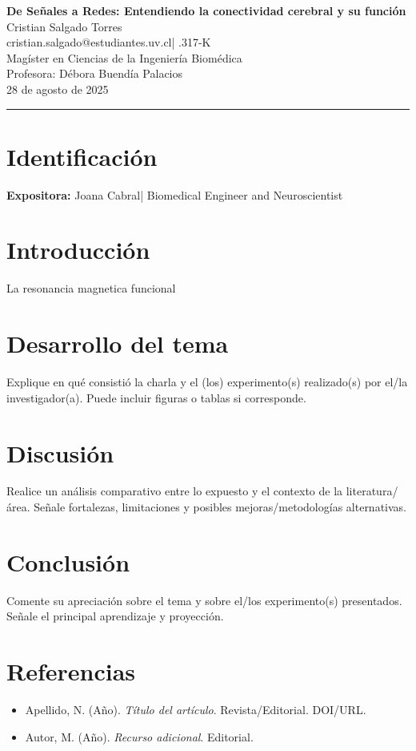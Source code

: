 \documentclass[10pt]{article}
\makeatletter
\newcommand{\titulodeltrabajo}{De Señales a Redes: Entendiendo la conectividad cerebral y su función}
\newcommand{\autor}{Cristian Salgado Torres}
\newcommand{\correo}{cristian.salgado@estudiantes.uv.cl}
\newcommand{\rut}{20.973.317-K}
\newcommand{\curso}{Magíster en Ciencias de la Ingeniería Biomédica}
\newcommand{\profesora}{Débora Buendía Palacios}
\newcommand{\fechaentrega}{28 de agosto de 2025}
\newcommand{\expositor}{Joana Cabral}
\makeatother
\begin{document}
\begin{center}
  {\LARGE \textbf{\titulodeltrabajo}}\\[8pt]
  {\large \autor}\\[2pt]
  \correo \quad | \quad \rut\\[6pt]
  \curso\\
  Profesora: \profesora\\
  \fechaentrega
\end{center}

\vspace{0.8em}
\hrule height 0.4pt
\vspace{0.8em}

\section*{Identificación}
\textbf{Expositora:} \expositor \quad | \quad
Biomedical Engineer and Neuroscientist

\section*{Introducción}
La resonancia magnetica funcional

\section*{Desarrollo del tema}
Explique en qué consistió la charla y el (los) experimento(s) realizado(s) por el/la investigador(a). Puede incluir figuras o tablas si corresponde.

\section*{Discusión}
Realice un análisis comparativo entre lo expuesto y el contexto de la literatura/área. Señale fortalezas, limitaciones y posibles mejoras/metodologías alternativas.

\section*{Conclusión}
Comente su apreciación sobre el tema y sobre el/los experimento(s) presentados. Señale el principal aprendizaje y proyección.

\section*{Referencias}
\begin{itemize}[leftmargin=0.7cm,itemsep=2pt]
  \item Apellido, N. (Año). \textit{Título del artículo}. Revista/Editorial. DOI/URL.
  \item Autor, M. (Año). \textit{Recurso adicional}. Editorial.
\end{itemize}
\end{document}
